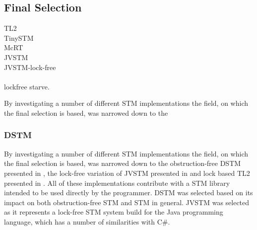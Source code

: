 

\subsection{Final Selection}
TL2 \cite{dice2006transactional}\\
TinySTM \cite{felber2008dynamic}\\
McRT \cite{saha2006mcrt}\\
JVSTM \cite{cachopo2007development}\\
JVSTM-lock-free\cite{fernandes2011lock}\\
\cite{herlihy2003software}\\
\cite{hendler2011nonblocking} lockfree starve.

By investigating a number of different \ac{STM} implementations the field, on which the final selection is based, was narrowed down to the


\subsubsection{DSTM}
By investigating a number of different \ac{STM} implementations the field, on which the final selection is based, was narrowed down to the obstruction-free DSTM presented in \cite{herlihy2003software}, the lock-free variation of JVSTM presented in \cite{fernandes2011lock} and lock based TL2 presented in \cite{dice2006transactional}. All of these implementations contribute with a \ac{STM} library intended to be used directly by the programmer\cite[p. 92]{herlihy2003software}\cite[p. 73]{cachopo2007development}\cite[p. 38]{lourencco2007testing}. DSTM was selected based on its impact on both obstruction-free \ac{STM} and  \ac{STM} in general. JVSTM was selected as it represents a lock-free \ac{STM} system build for the Java programming language, which has a number of similarities with C\#.

